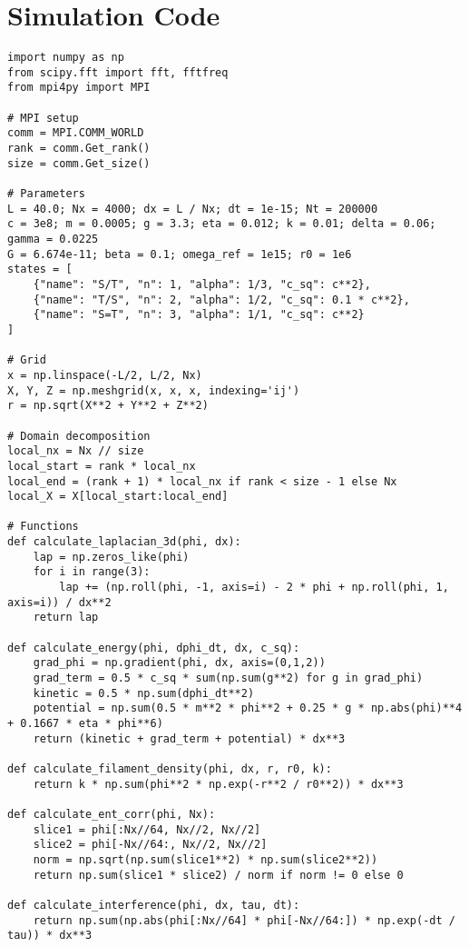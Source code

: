 \documentclass[11pt]{article}
\begin{document}
\section{Simulation Code}
\begin{lstlisting}
import numpy as np
from scipy.fft import fft, fftfreq
from mpi4py import MPI

# MPI setup
comm = MPI.COMM_WORLD
rank = comm.Get_rank()
size = comm.Get_size()

# Parameters
L = 40.0; Nx = 4000; dx = L / Nx; dt = 1e-15; Nt = 200000
c = 3e8; m = 0.0005; g = 3.3; eta = 0.012; k = 0.01; delta = 0.06; gamma = 0.0225
G = 6.674e-11; beta = 0.1; omega_ref = 1e15; r0 = 1e6
states = [
    {"name": "S/T", "n": 1, "alpha": 1/3, "c_sq": c**2},
    {"name": "T/S", "n": 2, "alpha": 1/2, "c_sq": 0.1 * c**2},
    {"name": "S=T", "n": 3, "alpha": 1/1, "c_sq": c**2}
]

# Grid
x = np.linspace(-L/2, L/2, Nx)
X, Y, Z = np.meshgrid(x, x, x, indexing='ij')
r = np.sqrt(X**2 + Y**2 + Z**2)

# Domain decomposition
local_nx = Nx // size
local_start = rank * local_nx
local_end = (rank + 1) * local_nx if rank < size - 1 else Nx
local_X = X[local_start:local_end]

# Functions
def calculate_laplacian_3d(phi, dx):
    lap = np.zeros_like(phi)
    for i in range(3):
        lap += (np.roll(phi, -1, axis=i) - 2 * phi + np.roll(phi, 1, axis=i)) / dx**2
    return lap

def calculate_energy(phi, dphi_dt, dx, c_sq):
    grad_phi = np.gradient(phi, dx, axis=(0,1,2))
    grad_term = 0.5 * c_sq * sum(np.sum(g**2) for g in grad_phi)
    kinetic = 0.5 * np.sum(dphi_dt**2)
    potential = np.sum(0.5 * m**2 * phi**2 + 0.25 * g * np.abs(phi)**4 + 0.1667 * eta * phi**6)
    return (kinetic + grad_term + potential) * dx**3

def calculate_filament_density(phi, dx, r, r0, k):
    return k * np.sum(phi**2 * np.exp(-r**2 / r0**2)) * dx**3

def calculate_ent_corr(phi, Nx):
    slice1 = phi[:Nx//64, Nx//2, Nx//2]
    slice2 = phi[-Nx//64:, Nx//2, Nx//2]
    norm = np.sqrt(np.sum(slice1**2) * np.sum(slice2**2))
    return np.sum(slice1 * slice2) / norm if norm != 0 else 0

def calculate_interference(phi, dx, tau, dt):
    return np.sum(np.abs(phi[:Nx//64] * phi[-Nx//64:]) * np.exp(-dt / tau)) * dx**3


\end{lstlisting}
\end{document}
